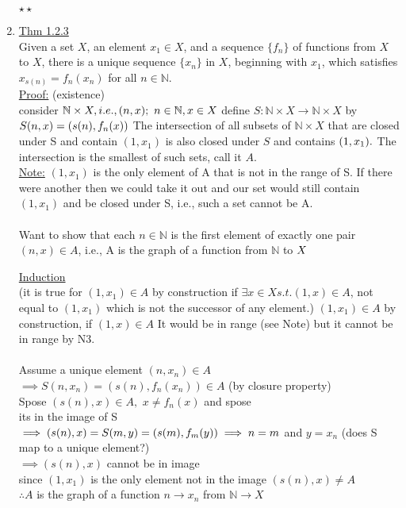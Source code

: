 \documentclass[12pt]{amsart}
\begin{document}
\begin{enumerate}
$\star \star$
\item \underline{Thm 1.2.3}\\
Given a set $X$, an element $ x_1 \in X$, and a sequence $\{f_n \}$ of functions from $X$ to $X$, there is a unique sequence $\{x_n \}$ in $X$, beginning with $x_1$, which satisfies $x_{s(n)} = f_n (x_n)$ for all $n \in \mathbb{N}$.\\
\underline{Proof:} (existence)\\
consider $\mathbb{N} \times X, i.e., (n,x);\,\, n \in \mathbb{N}, x \in X\\$
define $S: \mathbb{N} \times X \rightarrow \mathbb{N} \times X$ by\\
$S(n,x)=(s(n),f_n(x))\\$
The intersection of all subsets of $\mathbb{N} \times X$ that are closed under S and contain $(1,x_1)$ is also closed under $S$ and contains $(1,x_1).\\$
The intersection is the smallest of such sets, call it $A$.\\
\underline{Note:} $(1,x_1)$ is the only element of A that is not in the range of S. If there were another then we could take it out and our set would still contain $(1,x_1)$ and be closed under S, i.e., such a set cannot be A.\\
\\
Want to show that each $n \in \mathbb{N}$ is the first element of exactly one pair $(n,x) \in A$, i.e., A is the graph of a function from $\mathbb{N}$ to $X\\$

\underline{Induction}\\
(it is true for $(1,x_1) \in A$ by construction if $\exists x \in X s.t. (1,x) \in A$, not equal to $(1,x_1)$ which is not the successor of any element.) $(1,x_1) \in A$ by construction, if $(1,x) \in A$ It would be in range (see Note) but it cannot be in range by N3.\\
\\
Assume a unique element $(n,x_n) \in A$\\
$\implies S(n,x_n) = (s(n), f_n(x_n)) \in A$ (by closure property)\\
Spose $(s(n),x) \in A,\,\, x \neq f_n(x)$ and spose\\
its in the image of S\\
$\implies (s(n),x) = S(m,y) = (s(m),f_m (y)) \implies n = m\\$
and $y = x_n$ (does S map to a unique element?)\\
$\implies (s(n),x)$ cannot be in image\\
since $(1,x_1)$ is the only element not in the image $(s(n),x) \neq A$\\
$\therefore A$ is the graph of a function $n \rightarrow x_n$ from $\mathbb{N} \rightarrow X$



\end{enumerate}
\end{document}
